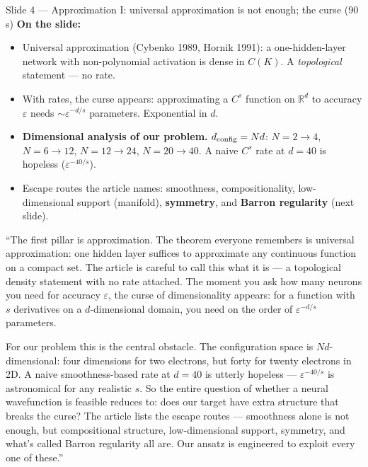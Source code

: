 \documentclass[11pt]{article}
\begin{document}
\begin{slide}{Slide 4 --- Approximation I: universal approximation is not enough; the curse (90\,s)}
\textbf{On the slide:}
\begin{itemize}[leftmargin=*]
\item Universal approximation (Cybenko 1989, Hornik 1991): a one-hidden-layer network with
non-polynomial activation is dense in $C(K)$. A \emph{topological} statement --- no rate.
\item With rates, the curse appears: approximating a $C^s$ function on $\mathbb R^d$ to accuracy
$\varepsilon$ needs $\sim\varepsilon^{-d/s}$ parameters. Exponential in $d$.
\item \textbf{Dimensional analysis of our problem.} $d_{\rm config}=Nd$: $N{=}2\to4$,
$N{=}6\to12$, $N{=}12\to24$, $N{=}20\to40$. A naive $C^s$ rate at $d{=}40$ is hopeless
($\varepsilon^{-40/s}$).
\item Escape routes the article names: smoothness, compositionality, low-dimensional support
(manifold), \textbf{symmetry}, and \textbf{Barron regularity} (next slide).
\end{itemize}
\end{slide}

\begin{say}
``The first pillar is approximation. The theorem everyone remembers is universal approximation: one
hidden layer suffices to approximate any continuous function on a compact set. The article is
careful to call this what it is --- a topological density statement with no rate attached. The
moment you ask how many neurons you need for accuracy $\varepsilon$, the curse of dimensionality
appears: for a function with $s$ derivatives on a $d$-dimensional domain, you need on the order of
$\varepsilon^{-d/s}$ parameters.

For our problem this is the central obstacle. The configuration space is $Nd$-dimensional: four
dimensions for two electrons, but forty for twenty electrons in 2D. A naive smoothness-based rate at
$d{=}40$ is utterly hopeless --- $\varepsilon^{-40/s}$ is astronomical for any realistic $s$. So the
entire question of whether a neural wavefunction is feasible reduces to: does our target have extra
structure that breaks the curse? The article lists the escape routes --- smoothness alone is not
enough, but compositional structure, low-dimensional support, symmetry, and what's called Barron
regularity all are. Our ansatz is engineered to exploit every one of these.''
\end{say}
\end{document}
